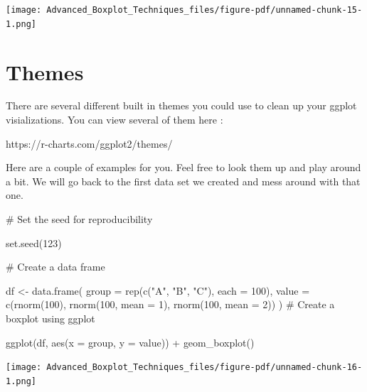 \documentclass[
  letterpaper,
  DIV=11,
  numbers=noendperiod]{scrreprt}
\newenvironment{Shaded}{\begin{snugshade}}{\end{snugshade}}
\newcommand{\AttributeTok}[1]{\textcolor[rgb]{0.40,0.45,0.13}{#1}}
\newcommand{\CommentTok}[1]{\textcolor[rgb]{0.37,0.37,0.37}{#1}}
\newcommand{\DecValTok}[1]{\textcolor[rgb]{0.68,0.00,0.00}{#1}}
\newcommand{\FunctionTok}[1]{\textcolor[rgb]{0.28,0.35,0.67}{#1}}
\newcommand{\NormalTok}[1]{\textcolor[rgb]{0.00,0.23,0.31}{#1}}
\newcommand{\OtherTok}[1]{\textcolor[rgb]{0.00,0.23,0.31}{#1}}
\newcommand{\SpecialCharTok}[1]{\textcolor[rgb]{0.37,0.37,0.37}{#1}}
\newcommand{\StringTok}[1]{\textcolor[rgb]{0.13,0.47,0.30}{#1}}
\begin{document}
\texttt{[image: Advanced\_Boxplot\_Techniques\_files/figure-pdf/unnamed-chunk-15-1.png]}

\section*{Themes}\label{themes}


There are several different built in themes you could use to clean up
your ggplot visializations. You can view several of them here :

https://r-charts.com/ggplot2/themes/

Here are a couple of examples for you. Feel free to look them up and
play around a bit. We will go back to the first data set we created and
mess around with that one.

\begin{Shaded}
\begin{Highlighting}[]
\CommentTok{\# Set the seed for reproducibility}

\FunctionTok{set.seed}\NormalTok{(}\DecValTok{123}\NormalTok{)}

\CommentTok{\# Create a data frame}

\NormalTok{df }\OtherTok{\textless{}{-}} \FunctionTok{data.frame}\NormalTok{(}
  \AttributeTok{group =} \FunctionTok{rep}\NormalTok{(}\FunctionTok{c}\NormalTok{(}\StringTok{"A"}\NormalTok{, }\StringTok{"B"}\NormalTok{, }\StringTok{"C"}\NormalTok{), }\AttributeTok{each =} \DecValTok{100}\NormalTok{),}
  \AttributeTok{value =} \FunctionTok{c}\NormalTok{(}\FunctionTok{rnorm}\NormalTok{(}\DecValTok{100}\NormalTok{), }\FunctionTok{rnorm}\NormalTok{(}\DecValTok{100}\NormalTok{, }\AttributeTok{mean =} \DecValTok{1}\NormalTok{), }\FunctionTok{rnorm}\NormalTok{(}\DecValTok{100}\NormalTok{, }\AttributeTok{mean =} \DecValTok{2}\NormalTok{))}
\NormalTok{)}
\CommentTok{\# Create a boxplot using ggplot}

\FunctionTok{ggplot}\NormalTok{(df, }\FunctionTok{aes}\NormalTok{(}\AttributeTok{x =}\NormalTok{ group, }\AttributeTok{y =}\NormalTok{ value)) }\SpecialCharTok{+}
  \FunctionTok{geom\_boxplot}\NormalTok{()}
\end{Highlighting}
\end{Shaded}

\begin{center}
\texttt{[image: Advanced\_Boxplot\_Techniques\_files/figure-pdf/unnamed-chunk-16-1.png]}
\end{center}
\end{document}
